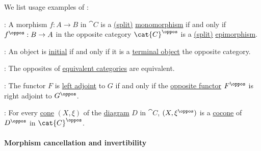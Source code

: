 \begin{example}\label{ex:thm:category_duality}
  We list usage examples of :
  \begin{thmenum}
     : A morphism \( f: A \to B \) in \( \cat{C} \) is a \hyperref[def:morphism_invertibility/left]{(split)} \hyperref[def:morphism_cancellation/left]{monomorphism} if and only if \( f^\oppos: B \to A \) in the opposite category \( \cat{C}^\oppos \) is a \hyperref[def:morphism_invertibility/right]{(split)} \hyperref[def:morphism_cancellation/right]{epimorphism}.

     : An object is \hyperref[def:universal_objects/initial]{initial} if and only if it is a \hyperref[def:universal_objects/terminal]{terminal object} the opposite category.

     : The opposites of \hyperref[def:equivalence_of_categories]{equivalent categories} are equivalent.

     : The functor \( F \) is \hyperref[def:adjoint_functor]{left adjoint} to \( G \) if and only if the \hyperref[def:opposite_functor]{opposite functor} \( F^\oppos \) is right adjoint to \( G^\oppos \).

     : For every \hyperref[def:category_of_cones/objects]{cone} \( (X, \xi) \) of the \hyperref[def:categorical_diagram]{diagram} \( D \) in \( \cat{C} \), \( (X, \xi^\oppos) \) is a \hyperref[def:category_of_cones/objects]{cocone} of \( D^\oppos \) in \( \cat{C}^\oppos \).
  \end{thmenum}
\end{example}

\paragraph{Morphism cancellation and invertibility}

